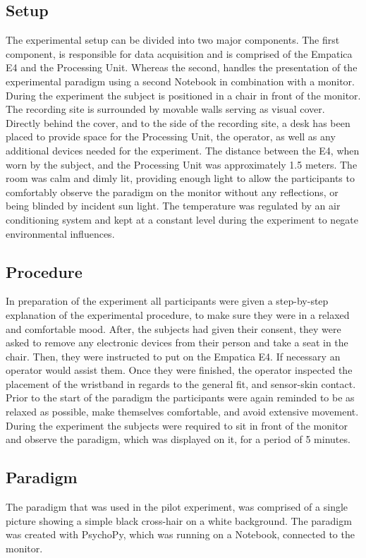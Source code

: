 \subsection{Setup}
The experimental setup can be divided into two major components. The first component, is responsible for data acquisition and is comprised of the Empatica E4 and the Processing Unit. Whereas the second, handles the presentation of the experimental paradigm using a second Notebook in combination with a monitor.
During the experiment the subject is positioned in a chair in front of the monitor. The recording site is surrounded by movable walls serving as visual cover. Directly behind the cover, and to the side of the recording site, a desk has been placed to provide space for the Processing Unit, the operator, as well as any additional devices needed for the experiment. The distance between the E4, when worn by the subject, and the Processing Unit was approximately 1.5 meters.
The room was calm and dimly lit, providing enough light to allow the participants to comfortably observe the paradigm on the monitor without any reflections, or being blinded by incident sun light. The temperature was regulated by an air conditioning system and kept at a constant level during the experiment to negate environmental influences.
\subsection{Procedure}
In preparation of the experiment all participants were given a step-by-step explanation of the experimental procedure, to make sure they were in a relaxed and comfortable mood. After, the subjects had given their consent, they were asked to remove any electronic devices from their person and take a seat in the chair. Then, they were instructed to put on the Empatica E4. If necessary an operator would assist them. Once they were finished, the operator inspected the placement of the wristband in regards to the general fit, and sensor-skin contact. Prior to the start of the paradigm the participants were again reminded to be as relaxed as possible, make themselves comfortable, and avoid extensive movement. During the experiment the subjects were required to sit in front of the monitor and observe the paradigm, which was displayed on it, for a period of 5 minutes. 
\subsection{Paradigm}
The paradigm that was used in the pilot experiment, was comprised of a single picture showing a simple black cross-hair on a white background. The paradigm was created with PsychoPy, which was running on a Notebook, connected to the monitor. 

